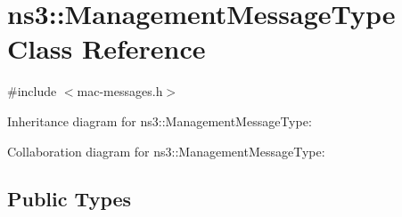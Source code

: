 \hypertarget{classns3_1_1ManagementMessageType}{}\section{ns3\+:\+:Management\+Message\+Type Class Reference}
\label{classns3_1_1ManagementMessageType}


{\ttfamily \#include $<$mac-\/messages.\+h$>$}



Inheritance diagram for ns3\+:\+:Management\+Message\+Type\+:


Collaboration diagram for ns3\+:\+:Management\+Message\+Type\+:
\subsection*{Public Types}
